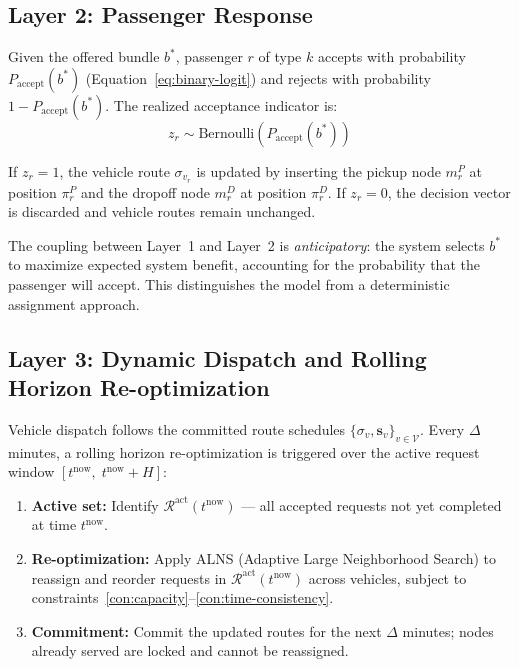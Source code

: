 \subsection{Layer 2: Passenger Response}

Given the offered bundle $b^*$, passenger $r$ of type $k$ accepts with probability
$P_{\text{accept}}(b^*)$ (Equation~\ref{eq:binary-logit}) and rejects with probability
$1 - P_{\text{accept}}(b^*)$. The realized acceptance indicator is:
\begin{equation}
  z_r \sim \text{Bernoulli}\!\left(P_{\text{accept}}(b^*)\right)
\end{equation}

If $z_r = 1$, the vehicle route $\sigma_{v_r}$ is updated by inserting the pickup node
$m_r^P$ at position $\pi_r^P$ and the dropoff node $m_r^D$ at position $\pi_r^D$.
If $z_r = 0$, the decision vector is discarded and vehicle routes remain unchanged.

The coupling between Layer~1 and Layer~2 is \emph{anticipatory}: the system selects $b^*$
to maximize expected system benefit, accounting for the probability that the passenger will
accept. This distinguishes the model from a deterministic assignment approach.

\subsection{Layer 3: Dynamic Dispatch and Rolling Horizon Re-optimization}

Vehicle dispatch follows the committed route schedules
$\{\sigma_v, \mathbf{s}_v\}_{v \in \mathcal{V}}$.
Every $\Delta$ minutes, a rolling horizon re-optimization is triggered over the active
request window $[t^{\text{now}},\; t^{\text{now}} + H]$:

\begin{enumerate}
  \item \textbf{Active set:} Identify $\mathcal{R}^{\text{act}}(t^{\text{now}})$ --- all
        accepted requests not yet completed at time $t^{\text{now}}$.
  \item \textbf{Re-optimization:} Apply ALNS (Adaptive Large Neighborhood Search) to
        reassign and reorder requests in $\mathcal{R}^{\text{act}}(t^{\text{now}})$ across
        vehicles, subject to constraints~\ref{con:capacity}--\ref{con:time-consistency}.
  \item \textbf{Commitment:} Commit the updated routes for the next $\Delta$ minutes;
        nodes already served are locked and cannot be reassigned.
\end{enumerate}

